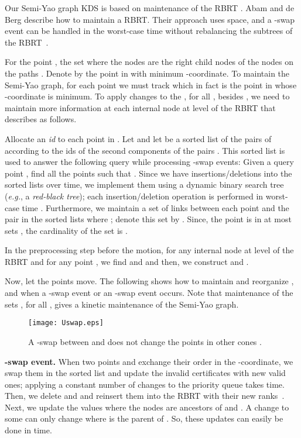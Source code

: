 \documentclass[11pt]{llncs}
\newcommand{\eg}{\emph{e.g.}}
\begin{document}
Our Semi-Yao graph KDS is based on maintenance of the RBRT . Abam and de Berg describe how to maintain a RBRT. Their approach uses  space, and a -swap event can be handled in the worst-case time  without rebalancing the subtrees of the RBRT~\cite{Abam:2011:KSX:1971362.1971367}.

For the point , the set  where the nodes  are the right child nodes of the nodes on the paths . Denote by  the point in  with minimum -coordinate. To maintain the Semi-Yao graph, for each point  we must track  which in fact is the point in  whose -coordinate is minimum. To apply changes to the , for all , besides , we need to maintain more information at each internal node  at level  of the RBRT  that describes as follows.



Allocate an \textit{id} to each point in . Let  and let  be a sorted list of the pairs of  according to the ids of the second components  of the pairs . This sorted list is used to answer the following query while processing -swap events: Given a query point , find all the points  such that . Since we have insertions/deletions into the sorted lists  over time, we implement them using a dynamic binary search tree (\eg, a \textit{red-black tree}); each insertion/deletion operation is performed in worst-case time . Furthermore, we maintain a set of links between each point  and the pair  in the sorted lists  where ; denote this set by . Since, the point  is in at most  sets , the cardinality of the set  is .

In the preprocessing step before the motion, for any internal node  at level  of the RBRT and for any point , we find  and  and then, we construct  and .


Now, let the points move. The following shows how to maintain and reorganize ,  and   when a -swap event or an -swap event occurs. Note that maintenance of the sets , for all , gives a kinetic maintenance of the Semi-Yao graph.

\begin{wrapfigure}{r}{0.4\textwidth}
\vspace{-25pt}
  \begin{center}
    \texttt{[image: Uswap.eps]}
  \end{center}
  \vspace{-10pt}
  \caption{\small A -swap between  and  does not change the points in other cones .}
  \vspace{-15pt}
  \label{fig:Uswap}
\end{wrapfigure}
\textbf{-swap event.}
When two points  and  exchange their order in the -coordinate, we swap them in the sorted list  and update the invalid certificates with new valid ones; applying a constant number of changes to the priority queue takes  time. Then, we delete  and  and reinsert them into the RBRT with their new ranks~\cite{Abam:2011:KSX:1971362.1971367}. Next, we update the values  where the nodes  are ancestors of  and . A change to some  can only change  where  is the parent of . So, these updates can easily be done in  time.
\end{document}

